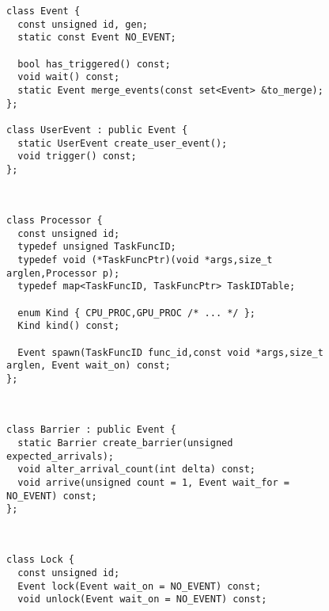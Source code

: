 \begin{figure}
\begin{lrbox}{\mylistingbox}
\begin{lstlisting}
class Event {
  const unsigned id, gen;
  static const Event NO_EVENT;

  bool has_triggered() const;
  void wait() const;
  static Event merge_events(const set<Event> &to_merge);
};

class UserEvent : public Event {
  static UserEvent create_user_event();
  void trigger() const;
};
\end{lstlisting}
\end{lrbox}
\subfigure{\usebox{\mylistingbox}} \\
\vspace{-0.2cm}

\begin{lrbox}{\mylistingbox}
\begin{lstlisting}[firstnumber=14]
class Processor {
  const unsigned id;
  typedef unsigned TaskFuncID;
  typedef void (*TaskFuncPtr)(void *args,size_t arglen,Processor p);
  typedef map<TaskFuncID, TaskFuncPtr> TaskIDTable;

  enum Kind { CPU_PROC,GPU_PROC /* ... */ };
  Kind kind() const;

  Event spawn(TaskFuncID func_id,const void *args,size_t arglen, Event wait_on) const;
};
\end{lstlisting}
\end{lrbox}
\subfigure{\usebox{\mylistingbox}} \\
\vspace{-0.2cm}

\begin{lrbox}{\mylistingbox}
\begin{lstlisting}[firstnumber=25]
class Barrier : public Event {
  static Barrier create_barrier(unsigned expected_arrivals);
  void alter_arrival_count(int delta) const;
  void arrive(unsigned count = 1, Event wait_for = NO_EVENT) const;
};
\end{lstlisting}
\end{lrbox}
\subfigure{\usebox{\mylistingbox}} \\
\vspace{-0.2cm}

\begin{lrbox}{\mylistingbox}
\begin{lstlisting}[firstnumber=30]
class Lock {
  const unsigned id;
  Event lock(Event wait_on = NO_EVENT) const;
  void unlock(Event wait_on = NO_EVENT) const;


\end{lstlisting}
\end{lrbox}
\end{figure}
